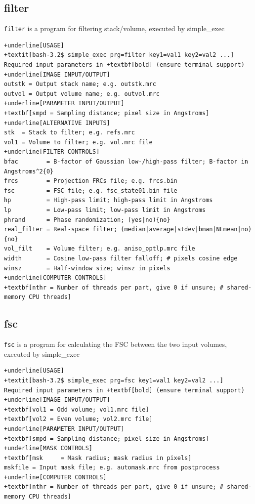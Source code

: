 \documentclass[a4paper,11pt]{article}
\newcommand{\prgname}[1]{\textcolor{NavyBlue}{\texttt{#1}}}
\begin{document}
\subsection{filter}
\label{filter}
\prgname{filter} is a program for filtering stack/volume, executed by simple\_exec
\begin{Verbatim}[commandchars=+\[\],fontsize=\small,breaklines=true]
+underline[USAGE]
+textit[bash-3.2$ simple_exec prg=filter key1=val1 key2=val2 ...]
Required input parameters in +textbf[bold] (ensure terminal support)
+underline[IMAGE INPUT/OUTPUT]
outstk = Output stack name; e.g. outstk.mrc
outvol = Output volume name; e.g. outvol.mrc
+underline[PARAMETER INPUT/OUTPUT]
+textbf[smpd = Sampling distance; pixel size in Angstroms]
+underline[ALTERNATIVE INPUTS]
stk  = Stack to filter; e.g. refs.mrc
vol1 = Volume to filter; e.g. vol.mrc file
+underline[FILTER CONTROLS]
bfac        = B-factor of Gaussian low-/high-pass filter; B-factor in Angstroms^2{0}
frcs        = Projection FRCs file; e.g. frcs.bin
fsc         = FSC file; e.g. fsc_state01.bin file
hp          = High-pass limit; high-pass limit in Angstroms
lp          = Low-pass limit; low-pass limit in Angstroms
phrand      = Phase randomization; (yes|no){no}
real_filter = Real-space filter; (median|average|stdev|bman|NLmean|no){no}
vol_filt    = Volume filter; e.g. aniso_optlp.mrc file
width       = Cosine low-pass filter falloff; # pixels cosine edge
winsz       = Half-window size; winsz in pixels
+underline[COMPUTER CONTROLS]
+textbf[nthr = Number of threads per part, give 0 if unsure; # shared-memory CPU threads]
\end{Verbatim}

\subsection{fsc}
\label{fsc}
\prgname{fsc} is a program for calculating the FSC between the two input volumes, executed by simple\_exec
\begin{Verbatim}[commandchars=+\[\],fontsize=\small,breaklines=true]
+underline[USAGE]
+textit[bash-3.2$ simple_exec prg=fsc key1=val1 key2=val2 ...]
Required input parameters in +textbf[bold] (ensure terminal support)
+underline[IMAGE INPUT/OUTPUT]
+textbf[vol1 = Odd volume; vol1.mrc file]
+textbf[vol2 = Even volume; vol2.mrc file]
+underline[PARAMETER INPUT/OUTPUT]
+textbf[smpd = Sampling distance; pixel size in Angstroms]
+underline[MASK CONTROLS]
+textbf[msk     = Mask radius; mask radius in pixels]
mskfile = Input mask file; e.g. automask.mrc from postprocess
+underline[COMPUTER CONTROLS]
+textbf[nthr = Number of threads per part, give 0 if unsure; # shared-memory CPU threads]
\end{Verbatim}
\end{document}
